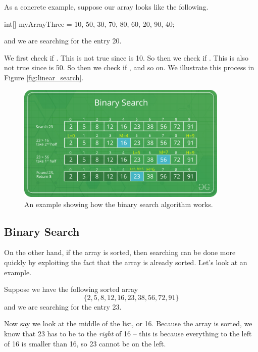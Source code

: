 As a concrete example, suppose our array looks like the following.
 \begin{code}
int[] myArrayThree = {10, 50, 30, 70, 80, 60, 20, 90, 40};
\end{code}
and we are searching for the entry 20. 

We first check if . This is not true since  is 10. So then we check if . This is also not true since  is 50. So then we check if , and so on. We illustrate this process in Figure \ref{fig:linear_search}.

 
   \begin{figure}
    \centering
    \includegraphics[width=0.9\textwidth]{lectures/images/Binary-Search.png}
    \caption{An example showing how the binary search algorithm works.}
    \label{fig:binary_search}
\end{figure}
 
 \subsection{Binary Search}
 On the other hand, if the array is sorted, then searching can be done more quickly by exploiting the fact that the array is already sorted. Let's look at an example.
 
 Suppose we have the following sorted array
 \begin{equation*}
     \{2, 5, 8, 12, 16, 23, 38, 56, 72, 91\}
 \end{equation*}
 and we are searching for the entry 23. 

Now say we look at the middle of the list, or 16. Because the array is sorted, we know that 23 has to be to the \emph{right} of 16 -- this is because everything to the left of 16 is smaller than 16, so 23 cannot be on the left.

